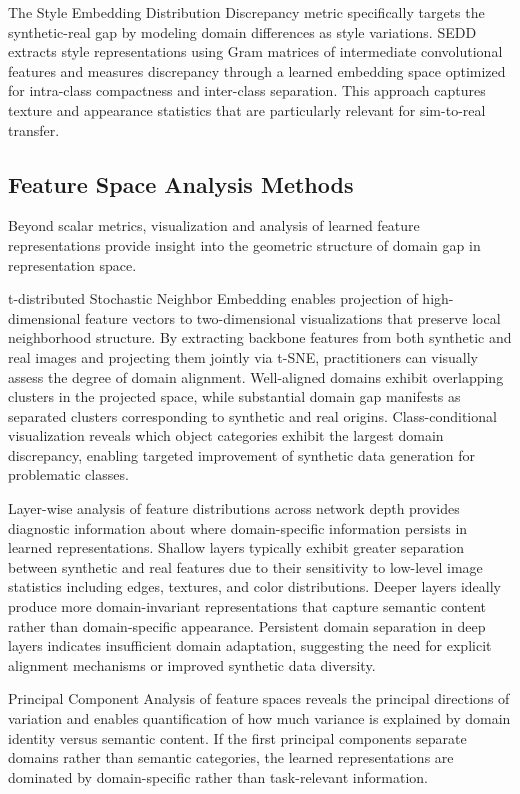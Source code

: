 The Style Embedding Distribution Discrepancy metric specifically targets the synthetic-real gap by modeling domain differences as style variations. SEDD extracts style representations using Gram matrices of intermediate convolutional features and measures discrepancy through a learned embedding space optimized for intra-class compactness and inter-class separation. This approach captures texture and appearance statistics that are particularly relevant for sim-to-real transfer.

\subsection{Feature Space Analysis Methods}

Beyond scalar metrics, visualization and analysis of learned feature representations provide insight into the geometric structure of domain gap in representation space.

t-distributed Stochastic Neighbor Embedding enables projection of high-dimensional feature vectors to two-dimensional visualizations that preserve local neighborhood structure. By extracting backbone features from both synthetic and real images and projecting them jointly via t-SNE, practitioners can visually assess the degree of domain alignment. Well-aligned domains exhibit overlapping clusters in the projected space, while substantial domain gap manifests as separated clusters corresponding to synthetic and real origins. Class-conditional visualization reveals which object categories exhibit the largest domain discrepancy, enabling targeted improvement of synthetic data generation for problematic classes.

Layer-wise analysis of feature distributions across network depth provides diagnostic information about where domain-specific information persists in learned representations. Shallow layers typically exhibit greater separation between synthetic and real features due to their sensitivity to low-level image statistics including edges, textures, and color distributions. Deeper layers ideally produce more domain-invariant representations that capture semantic content rather than domain-specific appearance. Persistent domain separation in deep layers indicates insufficient domain adaptation, suggesting the need for explicit alignment mechanisms or improved synthetic data diversity.

Principal Component Analysis of feature spaces reveals the principal directions of variation and enables quantification of how much variance is explained by domain identity versus semantic content. If the first principal components separate domains rather than semantic categories, the learned representations are dominated by domain-specific rather than task-relevant information.

